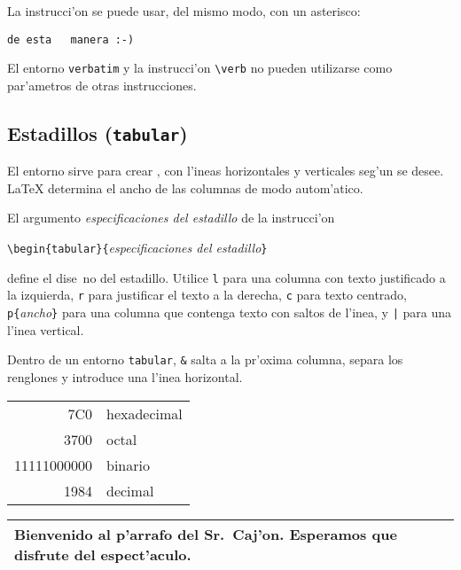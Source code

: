 La instrucci'on  se puede usar, del mismo modo, con un
asterisco:
\begin{example}
\verb*|de esta   manera :-) |
\end{example}

El entorno \texttt{verbatim} y la instrucci'on \verb|\verb| no pueden
utilizarse como par'ametros de otras instrucciones.


\subsection{Estadillos (\texttt{tabular})}

El entorno  sirve para crear , con l'ineas
horizontales y verticales seg'un se desee. \LaTeX{} determina el ancho
de las columnas de modo autom'atico.

El argumento \emph{especificaciones del estadillo} de la instrucci'on
\begin{command}
\verb|\begin{tabular}{|\emph{especificaciones del estadillo}\verb|}|
\end{command}
\noindent define el dise~no del estadillo. Utilice \texttt{l} para una
columna con texto justificado a la izquierda, \texttt{r} para
justificar el texto a la derecha, \texttt{c} para texto centrado,
\verb|p{|\emph{ancho}\verb|}| para una columna que contenga texto con
saltos de l'inea, y \verb.|. para una l'inea vertical.


Dentro de un entorno \texttt{tabular}, \verb|&| salta a la pr'oxima
columna, \ci{\bs} separa los renglones y  introduce una
l'inea horizontal.
\begin{example}
\begin{tabular}{|r|l|}
\hline
7C0 & hexadecimal \\
3700 & octal \\
11111000000 & binario \\
\hline \hline
1984 & decimal \\
\hline
\end{tabular}
\end{example}

\begin{example}
\begin{tabular}{|p{4.7cm}|}
\hline
Bienvenido al p'arrafo del Sr.\
Caj'on. Esperamos que disfrute
del espect'aculo.\\
\hline
\end{tabular}

\end{example}

